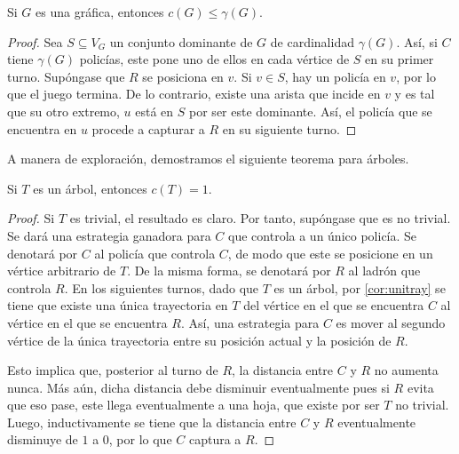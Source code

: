 \begin{lema}
\label{lem:cotasup-dominante}
  Si $G$ es una gr\'afica, entonces $c(G)\leq \gamma(G)$.
\end{lema}

\begin{proof}
  Sea $S\subseteq V_G$ un conjunto dominante de $G$ de cardinalidad $\gamma(G)$.
  As\'i, si $C$ tiene $\gamma(G)$ polic\'ias, este pone uno de ellos en cada
  v\'ertice de $S$ en su primer turno. Sup\'ongase que $R$ se posiciona en $v$.
  Si $v\in S$, hay un polic\'ia en $v$, por lo que el juego termina. De lo
  contrario, existe una arista que incide en $v$ y es tal que su otro extremo,
  $u$ est\'a en $S$ por ser este dominante. As\'i, el polic\'ia que se encuentra
  en $u$ procede a capturar a $R$ en su siguiente turno.

\end{proof}

A manera de exploraci\'on, demostramos el siguiente teorema para \'arboles.

\begin{teorema}
\label{teo:copnum-arbol}
  Si $T$ es un \'arbol, entonces $c(T)=1$.
\end{teorema}

\begin{proof}
  Si $T$ es trivial, el resultado es claro. Por tanto, sup\'ongase que es no
  trivial. Se dar\'a una estrategia ganadora para $C$ que controla a un \'unico
  polic\'ia. Se denotar\'a por $C$ al polic\'ia que controla $C$, de modo que
  este se posicione en un v\'ertice arbitrario de $T$. De la misma forma, se
  denotar\'a por $R$ al ladr\'on que controla $R$. En los siguientes turnos,
  dado que $T$ es un \'arbol, por \cref{cor:unitray} se tiene que existe una
  \'unica trayectoria en $T$ del v\'ertice en el que se encuentra $C$ al
  v\'ertice en el que se encuentra $R$. As\'i, una estrategia para $C$ es mover
  al segundo v\'ertice de la \'unica trayectoria entre su posici\'on actual y la
  posici\'on de $R$.

  Esto implica que, posterior al turno de $R$, la distancia entre $C$ y $R$ no
  aumenta nunca. M\'as a\'un, dicha distancia debe disminuir eventualmente pues
  si $R$ evita que eso pase, este llega eventualmente a una hoja, que existe por
  ser $T$ no trivial. Luego, inductivamente se tiene que la distancia entre $C$
  y $R$ eventualmente disminuye de $1$ a $0$, por lo que $C$ captura a $R$.

\end{proof}


